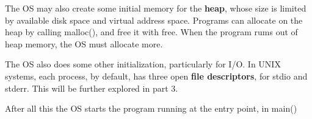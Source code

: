 \documentclass{article}
\begin{document}
The OS may also create some initial memory for the \textbf{heap}, whose size is limited by available disk space and virtual address space.
Programs can allocate on the heap by calling \textsf{malloc()}, and free it with \textsf{free}.
When the program rums out of heap memory, the OS must allocate more.

The OS also does some other initialization, particularly for I/O.
In UNIX systems, each process, by default, has three open \textbf{file descriptors}, for stdio and stderr.
This will be further explored in part 3.

After all this the OS starts the program running at the entry point, in \textsf{main()}

\subsection{}
\end{document}
